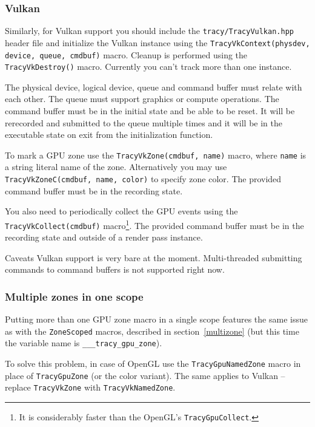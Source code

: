 \documentclass[hidelinks,titlepage,a4paper]{article}
\begin{document}
\subsubsection{Vulkan}

Similarly, for Vulkan support you should include the \texttt{tracy/TracyVulkan.hpp} header file and initialize the Vulkan instance using the \texttt{TracyVkContext(physdev, device, queue, cmdbuf)} macro. Cleanup is performed using the \texttt{TracyVkDestroy()} macro. Currently you can't track more than one instance.

The physical device, logical device, queue and command buffer must relate with each other. The queue must support graphics or compute operations. The command buffer must be in the initial state and be able to be reset. It will be rerecorded and submitted to the queue multiple times and it will be in the executable state on exit from the initialization function.

To mark a GPU zone use the \texttt{TracyVkZone(cmdbuf, name)} macro, where \texttt{name} is a string literal name of the zone. Alternatively you may use \texttt{TracyVkZoneC(cmdbuf, name, color)} to specify zone color. The provided command buffer must be in the recording state.

You also need to periodically collect the GPU events using the \texttt{TracyVkCollect(cmdbuf)} macro\footnote{It is considerably faster than the OpenGL's \texttt{TracyGpuCollect}.}. The provided command buffer must be in the recording state and outside of a render pass instance.

\begin{bclogo}[
noborder=true,
couleur=black!5,
logo=\bcattention
]{Caveats}
Vulkan support is very bare at the moment. Multi-threaded submitting commands to command buffers is not supported right now.
\end{bclogo}

\subsubsection{Multiple zones in one scope}

Putting more than one GPU zone macro in a single scope features the same issue as with the \texttt{ZoneScoped} macros, described in section~\ref{multizone} (but this time the variable name is \texttt{\_\_\_tracy\_gpu\_zone}).

To solve this problem, in case of OpenGL use the \texttt{TracyGpuNamedZone} macro in place of \texttt{TracyGpuZone} (or the color variant). The same applies to Vulkan -- replace \texttt{TracyVkZone} with \texttt{TracyVkNamedZone}.
\end{document}
